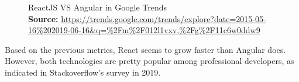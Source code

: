 \begin{figure}[H]
	\centering
	\qquad
	\caption{
		ReactJS VS Angular in Google Trends
		\\
		\textbf{Source:} \url{https://trends.google.com/trends/explore?date=2015-05-16\%202019-06-16\&q=\%2Fm\%2F012l1vxv,\%2Fg\%2F11c6w0ddw9}
	}
	\label{fig:example}
\end{figure}

Based on the previous metrics, React seems to grow faster than Angular does. However, both technologies are pretty popular among professional developers, as indicated in Stackoverflow's survey in 2019. 

